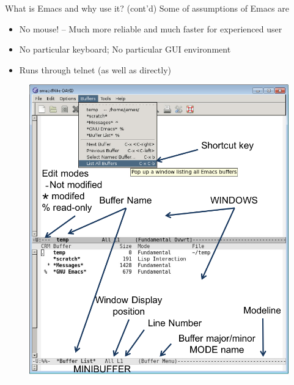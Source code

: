 \documentclass[newPxFont,sthlmFooter,nooffset]{beamer}
\begin{document}
\begin{frame}[t]{What is Emacs and why use it? (cont'd)}
Some of assumptions of Emacs are
\begin{itemize}
\item No mouse! – Much more reliable and much faster for experienced user
\item No particular keyboard; No particular GUI environment
\item Runs through telnet (as well as directly)
\end{itemize}
\end{frame}




\begin{frame}[t]{}
\begin{figure}\centering
  \includegraphics[height=\textheight]{./figure/emacs_layout.png}
\end{figure}
\end{frame}
\end{document}
